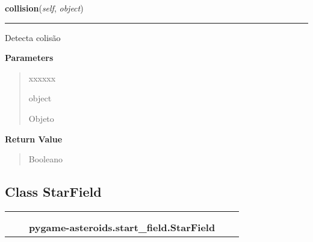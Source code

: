 \hspace{.8\funcindent}\begin{boxedminipage}{\funcwidth}

    \raggedright \textbf{collision}(\textit{self}, \textit{object})

    \vspace{-1.5ex}

    \rule{\textwidth}{0.5\fboxrule}
\setlength{\parskip}{2ex}
    Detecta colisão

\setlength{\parskip}{1ex}
      \textbf{Parameters}
      \vspace{-1ex}

      \begin{quote}
        \begin{Ventry}{xxxxxx}

          \item[object]

          Objeto

        \end{Ventry}

      \end{quote}

      \textbf{Return Value}
    \vspace{-1ex}

      \begin{quote}
      Booleano

      \end{quote}

    \end{boxedminipage}



\subsection{Class StarField}

    \label{pygame-asteroids:start_field:StarField}
\begin{tabular}{cccccc}
\multicolumn{2}{r}{\settowidth{\BCL}{object}\multirow{2}{\BCL}{object}}
&&
  \\\cline{3-3}
  &&\multicolumn{1}{c|}{}
&&
  \\
&&\multicolumn{2}{l}{\textbf{pygame-asteroids.start\_field.StarField}}
\end{tabular}


